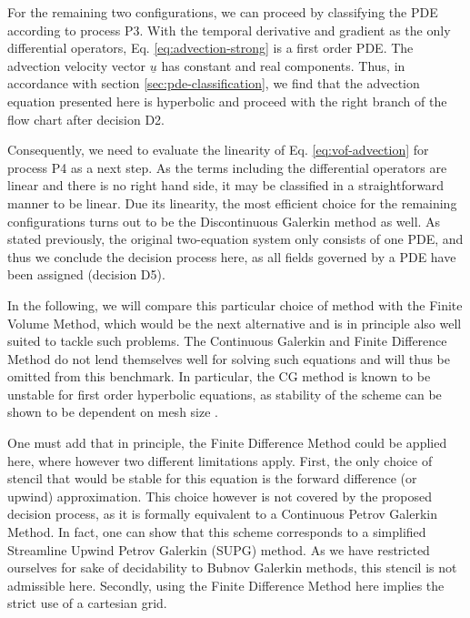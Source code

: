 \documentclass[sn-mathphys,Numbered]{sn-jnl}%
\theoremstyle{thmstyleone}%
\theoremstyle{thmstyletwo}%
\theoremstyle{thmstylethree}%
\begin{document}
For the remaining two configurations, we can proceed by classifying the PDE according to process P3.
With the temporal derivative and gradient as the only differential operators, Eq. \ref{eq:advection-strong} is a first order PDE.
The advection velocity vector $\underline{u}$ has constant and real components.
Thus, in accordance with section \ref{sec:pde-classification}, we find that the advection equation presented here is hyperbolic and proceed with the right branch of the flow chart after decision D2.

Consequently, we need to evaluate the linearity of Eq. \ref{eq:vof-advection} for process P4 as a next step.
As the terms including the differential operators are linear and there is no right hand side, it may be classified in a straightforward manner to be linear.
Due its linearity, the most efficient choice for the remaining configurations turns out to be the Discontinuous Galerkin method as well.
As stated previously, the original two-equation system only consists of one PDE, and thus we conclude the decision process here, as all fields governed by a PDE have been assigned (decision D5).

In the following, we will compare this particular choice of method with the Finite Volume Method, which would be the next alternative and is in principle also well suited to tackle such problems.
The Continuous Galerkin and Finite Difference Method do not lend themselves well for solving such equations and will thus be omitted from this benchmark.
In particular, the CG method is known to be unstable for first order hyperbolic equations, as stability of the scheme can be shown to be dependent on mesh size \cite{ernTheoryPracticeFinite2004}.

One must add that in principle, the Finite Difference Method could be applied here, where however two different limitations apply.
First, the only choice of stencil that would be stable for this equation is the forward difference (or upwind) approximation.
This choice however is not covered by the proposed decision process, as it is formally equivalent to a Continuous Petrov Galerkin Method.
In fact, one can show that this scheme corresponds to a simplified Streamline Upwind Petrov Galerkin (SUPG) method. As we have restricted ourselves for sake of decidability to Bubnov Galerkin methods, this stencil is not admissible here.
Secondly, using the Finite Difference Method here implies the strict use of a cartesian grid.
\end{document}
